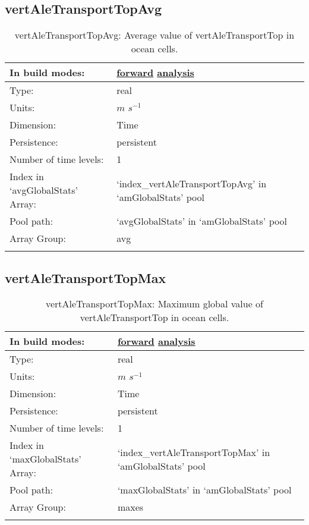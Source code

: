 \subsection[vertAleTransportTopAvg]{vertAleTransportTopAvg}
\label{subsec:var_sec_amGlobalStats_vertAleTransportTopAvg}
\begin{center}
\begin{longtable}{| p{2.0in} | p{4.0in} |}
        \hline 
        In build modes: & \hyperref[subsec:forward_var_tab_amGlobalStats]{forward} \hyperref[subsec:analysis_var_tab_amGlobalStats]{analysis} \\
        \hline 
        Type: & real \\
        \hline 
        Units: & $m$ $s^{-1}$ \\
        \hline 
        Dimension: & Time \\
        \hline 
        Persistence: & persistent \\
        \hline 
        Number of time levels: & 1 \\
        \hline 
		 Index in `avgGlobalStats' Array: & `index\_vertAleTransportTopAvg' in `amGlobalStats' pool \\
		 \hline 
            Pool path: & `avgGlobalStats' in `amGlobalStats' pool \\
		 \hline 
		 Array Group: & avg \\
		 \hline 
    \caption{vertAleTransportTopAvg: Average value of vertAleTransportTop in ocean cells.}
\end{longtable}
\end{center}
\subsection[vertAleTransportTopMax]{vertAleTransportTopMax}
\label{subsec:var_sec_amGlobalStats_vertAleTransportTopMax}
\begin{center}
\begin{longtable}{| p{2.0in} | p{4.0in} |}
        \hline 
        In build modes: & \hyperref[subsec:forward_var_tab_amGlobalStats]{forward} \hyperref[subsec:analysis_var_tab_amGlobalStats]{analysis} \\
        \hline 
        Type: & real \\
        \hline 
        Units: & $m$ $s^{-1}$ \\
        \hline 
        Dimension: & Time \\
        \hline 
        Persistence: & persistent \\
        \hline 
        Number of time levels: & 1 \\
        \hline 
		 Index in `maxGlobalStats' Array: & `index\_vertAleTransportTopMax' in `amGlobalStats' pool \\
		 \hline 
            Pool path: & `maxGlobalStats' in `amGlobalStats' pool \\
		 \hline 
		 Array Group: & maxes \\
		 \hline 
    \caption{vertAleTransportTopMax: Maximum global value of vertAleTransportTop in ocean cells.}
\end{longtable}
\end{center}
